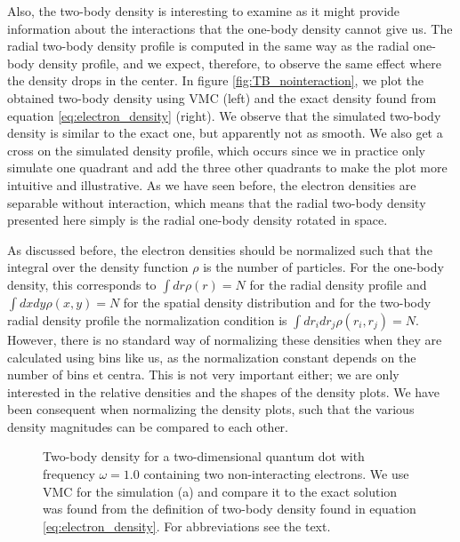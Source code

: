 Also, the two-body density is interesting to examine as it might provide information about the interactions that the one-body density cannot give us. The radial two-body density profile is computed in the same way as the radial one-body density profile, and we expect, therefore, to observe the same effect where the density drops in the center. In figure \eqref{fig:TB_nointeraction}, we plot the obtained two-body density using VMC (left) and the exact density found from equation \eqref{eq:electron_density} (right). We observe that the simulated two-body density is similar to the exact one, but apparently not as smooth. We also get a cross on the simulated density profile, which occurs since we in practice only simulate one quadrant and add the three other quadrants to make the plot more intuitive and illustrative. As we have seen before, the electron densities are separable without interaction, which means that the radial two-body density presented here simply is the radial one-body density rotated in space. 

As discussed before, the electron densities should be normalized such that the integral over the density function $\rho$ is the number of particles. For the one-body density, this corresponds to $\int dr\rho(r)=N$ for the radial density profile and $\int dxdy\rho(x,y)=N$ for the spatial density distribution and for the two-body radial density profile the normalization condition is $\int dr_idr_j\rho(r_i,r_j)=N$. However, there is no standard way of normalizing these densities when they are calculated using bins like us, as the normalization constant depends on the number of bins et centra. This is not very important either; we are only interested in the relative densities and the shapes of the density plots. We have been consequent when normalizing the density plots, such that the various density magnitudes can be compared to each other.

\begin{figure}
	\centering
	\captionsetup[subfigure]{labelformat=empty}
	\caption{Two-body density for a two-dimensional quantum dot with frequency $\omega=1.0$ containing two non-interacting electrons. We use VMC for the simulation (a) and compare it to the exact solution was found from the definition of two-body density found in equation \eqref{eq:electron_density}. For abbreviations see the text.}%
	\label{fig:TB_nointeraction}
\end{figure}

